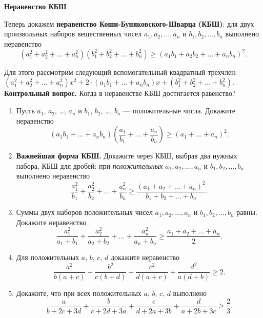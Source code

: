 \documentclass{article}
\begin{document}
\large
	
	
	\begin{center}
		\textbf{Неравенство КБШ}
	\end{center}
	
	Теперь докажем \textbf{неравенство Коши-Буняковского-Шварца (КБШ)}: для двух произвольных наборов вещественных чисел $a_1, a_2, \ldots, a_n$ и $b_1, b_2, \ldots, b_n$ выполнено неравенство
	$$
	(a_1^2+a_2^2+\ldots+a_n^2)(b_1^2+b_2^2+\ldots+b_n^2) \geqslant (a_1b_1+a_2b_2+\ldots+a_nb_n)^2.
	$$
	
	Для этого рассмотрим следующий вспомогательный квадратный трехчлен: $(a_1^2+a_2^2+\ldots+a_n^2)x^2+2\cdot(a_1b_1+\ldots+a_nb_n)x+(b_1^2+b_2^2+\ldots+b_n^2)$.
	\textbf{Контрольный вопрос.} Когда в неравенстве КБШ достигается равенство?
	
	\begin{enumerate}[label*=\protect\fbox{\arabic{enumi}}]
		
		\item Пусть $a_1$, $a_2$, \dots, $a_n$ и $b_1$, $b_2$, \dots, $b_n$ ---
		положительные числа. Докажите неравенство
		$$ \left(a_1 b_1 +\ldots + a_n b_n \right) \left( \frac{a_1}{b_1} + \ldots + \frac{a_n}{b_n} \right) \geqslant
		\left( a_1+\ldots+a_n \right)^2 .$$
		
		\item \textbf{Важнейшая форма КБШ.} Докажите через КБШ, выбрав два нужных набора, КБШ для дробей: при \textit{положительных} $a_1, a_2, \ldots, a_n$ и $b_1, b_2, \ldots, b_n$ выполнено неравенство
		$$
		\frac{a_1^2}{b_1}+\frac{a_2^2}{b_2}+\ldots+\frac{a_n^2}{b_n} \geqslant \frac{(a_1+a_2+\ldots+a_n)^2}{b_1+b_2+\ldots+b_n}.
		$$
		
		\item Суммы двух наборов положительных чисел $a_1, a_2, \ldots, a_n$ и $b_1, b_2, \ldots, b_n$ равны. Докажите неравенство
		$$
		\frac{a_1^2}{a_1+b_1}+\frac{a_2^2}{a_2+b_2}+\ldots+\frac{a_n^2}{a_n+b_n} \geqslant \frac{a_1+a_2+\ldots+a_n}{2}.
		$$
		
		\item Для положительных $a$, $b$, $c$, $d$ докажите неравенство
		$$
		\frac{a^2}{b(a+c)} + \frac{b^2}{c(b+d)} + 
		\frac{c^2}{d(a+c)} + \frac{d^2}{a(d+b)} \geqslant 2.
		$$
		
		\item Докажите, что при всех положительных $a$, $b$, $c$, $d$ выполнено
		$$
		\frac{a}{b+2c+3d} + \frac{b}{c+2d+3a} + \frac{c}{d+2a+3b} +
		\frac{d}{a+2b+3c} \geqslant \frac{2}{3}.
		$$
		

\end{enumerate}
\end{document}
